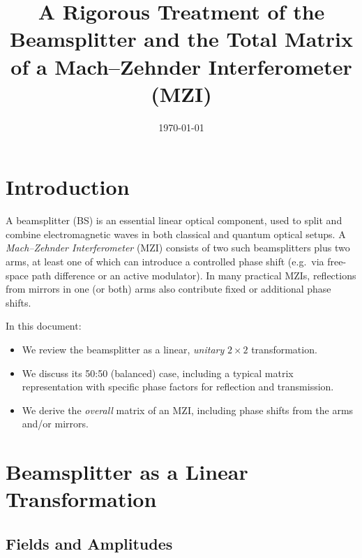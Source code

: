 \documentclass[12pt]{article}
\begin{document}
\title{\textbf{A Rigorous Treatment of the Beamsplitter and the Total Matrix of a Mach--Zehnder Interferometer (MZI)}}
\author{}
\date{\today}

\maketitle

\tableofcontents

\section{Introduction}

A beamsplitter (BS) is an essential linear optical component, used to split and combine electromagnetic waves in both classical and quantum optical setups.  A \emph{Mach--Zehnder Interferometer} (MZI) consists of two such beamsplitters plus two arms, at least one of which can introduce a controlled phase shift (e.g.\ via free-space path difference or an active modulator).  In many practical MZIs, reflections from mirrors in one (or both) arms also contribute fixed or additional phase shifts.

In this document:
\begin{itemize}
    \item We review the beamsplitter as a linear, \emph{unitary} $2\times 2$ transformation.
    \item We discuss its 50:50 (balanced) case, including a typical matrix representation with specific phase factors for reflection and transmission.
    \item We derive the \emph{overall} matrix of an MZI, including phase shifts from the arms and/or mirrors.
\end{itemize}

\section{Beamsplitter as a Linear Transformation}

\subsection{Fields and Amplitudes}
\end{document}
